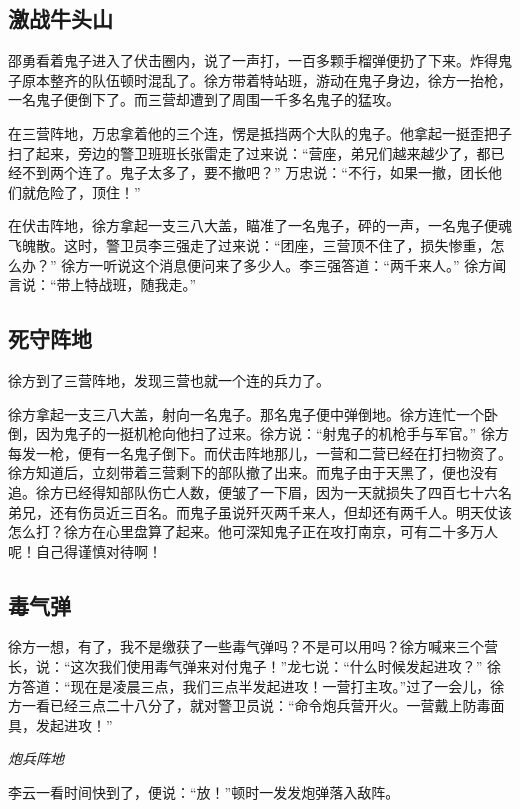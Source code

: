 \documentclass[UTF8,a4paper,titlepage,twoside,10.5pt]{article}
\begin{document}
\subsection{激战牛头山}
\label{sec:org0fda90f}

邵勇看着鬼子进入了伏击圈内，说了一声打，一百多颗手榴弹便扔了下来。炸得鬼子原本整齐的队伍顿时混乱了。徐方带着特站班，游动在鬼子身边，徐方一抬枪，一名鬼子便倒下了。而三营却遭到了周围一千多名鬼子的猛攻。

在三营阵地，万忠拿着他的三个连，愣是抵挡两个大队的鬼子。他拿起一挺歪把子扫了起来，旁边的警卫班班长张雷走了过来说：“营座，弟兄们越来越少了，都已经不到两个连了。鬼子太多了，要不撤吧？” 万忠说：“不行，如果一撤，团长他们就危险了，顶住！”

在伏击阵地，徐方拿起一支三八大盖，瞄准了一名鬼子，砰的一声，一名鬼子便魂飞魄散。这时，警卫员李三强走了过来说：“团座，三营顶不住了，损失惨重，怎么办？” 徐方一听说这个消息便问来了多少人。李三强答道：“两千来人。” 徐方闻言说：“带上特战班，随我走。”

\subsection{死守阵地}
\label{sec:org4613bd4}

徐方到了三营阵地，发现三营也就一个连的兵力了。

徐方拿起一支三八大盖，射向一名鬼子。那名鬼子便中弹倒地。徐方连忙一个卧倒，因为鬼子的一挺机枪向他扫了过来。徐方说：“射鬼子的机枪手与军官。” 徐方每发一枪，便有一名鬼子倒下。而伏击阵地那儿，一营和二营已经在打扫物资了。徐方知道后，立刻带着三营剩下的部队撤了出来。而鬼子由于天黑了，便也没有追。徐方已经得知部队伤亡人数，便皱了一下眉，因为一天就损失了四百七十六名弟兄，还有伤员近三百名。而鬼子虽说歼灭两千来人，但却还有两千人。明天仗该怎么打？徐方在心里盘算了起来。他可深知鬼子正在攻打南京，可有二十多万人呢！自己得谨慎对待啊！

\subsection{毒气弹}
\label{sec:orged5ab18}

徐方一想，有了，我不是缴获了一些毒气弹吗？不是可以用吗？徐方喊来三个营长，说：“这次我们使用毒气弹来对付鬼子！”龙七说：“什么时候发起进攻？” 徐方答道：“现在是凌晨三点，我们三点半发起进攻！一营打主攻。”过了一会儿，徐方一看已经三点二十八分了，就对警卫员说：“命令炮兵营开火。一营戴上防毒面具，发起进攻！”

\emph{炮兵阵地}

李云一看时间快到了，便说：“放！”顿时一发发炮弹落入敌阵。
\end{document}
